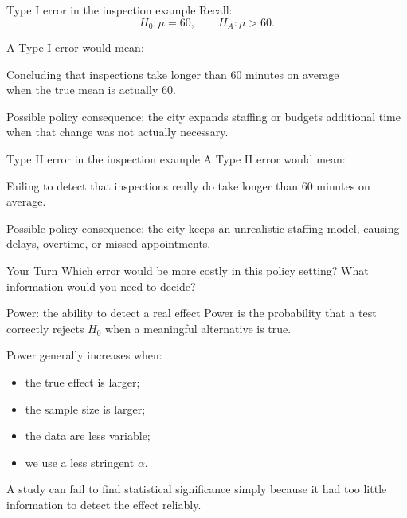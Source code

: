 \documentclass[11pt,aspectratio=169]{beamer}
\newcommand{\yourturn}[1]{%
\pause
\begin{center}
\begin{minipage}{0.90\textwidth}
\begin{alertblock}{Your Turn}
#1
\end{alertblock}
\end{minipage}
\end{center}}
\begin{document}
\begin{frame}{Type I error in the inspection example}
Recall:
\[
H_0:\mu=60,\qquad H_A:\mu>60.
\]

A \alert{Type I error} would mean:

\begin{center}
\Large Concluding that inspections take longer than 60 minutes on average\\
when the true mean is actually 60.
\end{center}

\vfill
Possible policy consequence: the city expands staffing or budgets additional time when that change was not actually necessary.
\end{frame}

\begin{frame}{Type II error in the inspection example}
A \alert{Type II error} would mean:

\begin{center}
\Large Failing to detect that inspections really do take longer than 60 minutes on average.
\end{center}

\vfill
Possible policy consequence: the city keeps an unrealistic staffing model, causing delays, overtime, or missed appointments.

\vspace{0.8em}
\yourturn{Which error would be more costly in this policy setting? What information would you need to decide?}
\end{frame}

\begin{frame}{Power: the ability to detect a real effect}
\alert{Power} is the probability that a test correctly rejects $H_0$ when a meaningful alternative is true.

Power generally increases when:
\begin{itemize}
  \item the true effect is larger;
  \item the sample size is larger;
  \item the data are less variable;
  \item we use a less stringent $\alpha$.
\end{itemize}

\vfill
A study can fail to find statistical significance simply because it had too little information to detect the effect reliably.
\end{frame}
\end{document}
